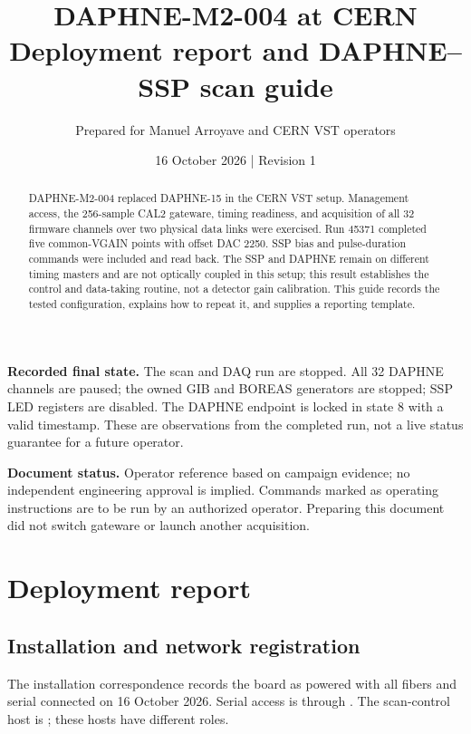\documentclass[10pt,a4paper]{article}
\title{DAPHNE-M2-004 at CERN\\\large Deployment report and DAPHNE--SSP scan guide}
\author{Prepared for Manuel Arroyave and CERN VST operators}
\date{16 October 2026 \quad | \quad Revision 1}
\newcommand{\code}[1]{\texttt{\detokenize{#1}}}
\begin{document}
\maketitle
\begin{abstract}
DAPHNE-M2-004 replaced DAPHNE-15 in the CERN VST setup. Management access, the 256-sample CAL2 gateware, timing readiness, and acquisition of all 32 firmware channels over two physical data links were exercised. Run 45371 completed five common-VGAIN points with offset DAC 2250. SSP bias and pulse-duration commands were included and read back. The SSP and DAPHNE remain on different timing masters and are not optically coupled in this setup; this result establishes the control and data-taking routine, not a detector gain calibration. This guide records the tested configuration, explains how to repeat it, and supplies a reporting template.
\end{abstract}
\textbf{Recorded final state.} The scan and DAQ run are stopped. All 32 DAPHNE channels are paused; the owned GIB and BOREAS generators are stopped; SSP LED registers are disabled. The DAPHNE endpoint is locked in state 8 with a valid timestamp. These are observations from the completed run, not a live status guarantee for a future operator.

\textbf{Document status.} Operator reference based on campaign evidence; no independent engineering approval is implied. Commands marked as operating instructions are to be run by an authorized operator. Preparing this document did not switch gateware or launch another acquisition.
\newpage
\tableofcontents
\newpage
\section{Deployment report}
\subsection{Installation and network registration}
The installation correspondence records the board as powered with all fibers and serial connected on 16 October 2026. Serial access is through \code{np04-onl-004}. The scan-control host is \code{np04-srv-017}; these hosts have different roles.
\end{document}

